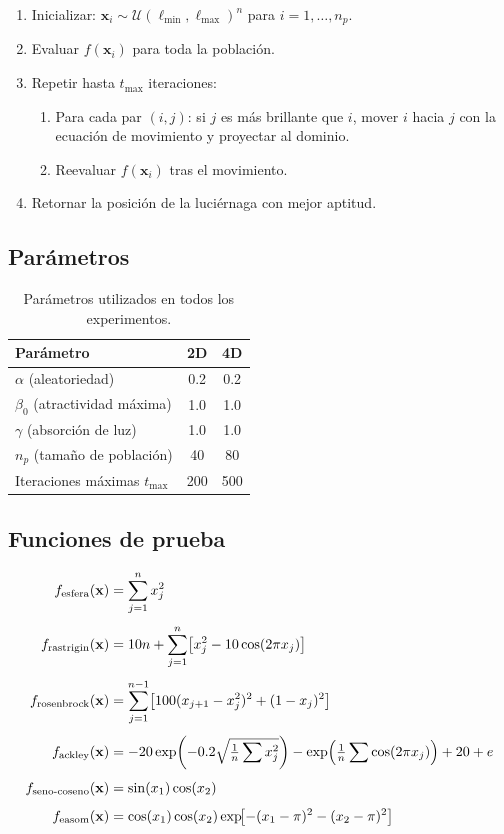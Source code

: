 \documentclass[11pt]{article}
\begin{document}
\begin{enumerate}
    \item Inicializar: $\mathbf{x}_i \sim \mathcal{U}(\ell_{\min}, \ell_{\max})^n$ para $i = 1,\ldots,n_p$.
    \item Evaluar $f(\mathbf{x}_i)$ para toda la poblaci\'on.
    \item Repetir hasta $t_{\max}$ iteraciones:
    \begin{enumerate}
        \item Para cada par $(i, j)$: si $j$ es m\'as brillante que $i$, mover $i$ hacia $j$ con la ecuaci\'on de movimiento y proyectar al dominio.
        \item Reevaluar $f(\mathbf{x}_i)$ tras el movimiento.
    \end{enumerate}
    \item Retornar la posici\'on de la luci\'ernaga con mejor aptitud.
\end{enumerate}

\subsection{Par\'ametros}

\begin{table}[H]
\centering
\begin{tabular}{lcc}
\hline\hline
Par\'ametro & 2D & 4D \\
\hline
$\alpha$ (aleatoriedad)              & 0.2  & 0.2  \\
$\beta_0$ (atractividad m\'axima)   & 1.0  & 1.0  \\
$\gamma$ (absorci\'on de luz)       & 1.0  & 1.0  \\
$n_p$ (tama\~no de poblaci\'on)     & 40   & 80   \\
Iteraciones m\'aximas $t_{\max}$    & 200  & 500  \\
\hline\hline
\end{tabular}
\caption{Par\'ametros utilizados en todos los experimentos.}
\end{table}

\subsection{Funciones de prueba}

\begin{align}
f_{\text{esfera}}(\mathbf{x}) &= \sum_{j=1}^{n} x_j^2 \notag\\[4pt]
f_{\text{rastrigin}}(\mathbf{x}) &= 10n + \sum_{j=1}^{n}\bigl[x_j^2 - 10\cos(2\pi x_j)\bigr] \notag\\[4pt]
f_{\text{rosenbrock}}(\mathbf{x}) &= \sum_{j=1}^{n-1}\bigl[100(x_{j+1}-x_j^2)^2 + (1-x_j)^2\bigr] \notag\\[4pt]
f_{\text{ackley}}(\mathbf{x}) &= -20\exp\!\left(-0.2\sqrt{\tfrac{1}{n}\sum x_j^2}\right) - \exp\!\left(\tfrac{1}{n}\sum\cos(2\pi x_j)\right) + 20 + e \notag\\[4pt]
f_{\text{seno-coseno}}(\mathbf{x}) &= \sin(x_1)\cos(x_2) \notag\\[4pt]
f_{\text{easom}}(\mathbf{x}) &= \cos(x_1)\cos(x_2)\exp\!\bigl[-(x_1-\pi)^2-(x_2-\pi)^2\bigr] \notag
\end{align}
\end{document}

